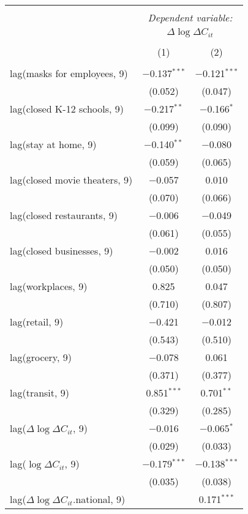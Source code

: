 \begin{tabular}{@{\extracolsep{1pt}}lcc} 
\\[-1.8ex]\hline 
\hline \\[-1.8ex] 
 & \multicolumn{2}{c}{\textit{Dependent variable:}} \\ 
\cline{2-3} 
 & \multicolumn{2}{c}{$\Delta \log \Delta C_{it}$} \\ 
\\[-1.8ex] & (1) & (2)\\ 
\hline \\[-1.8ex] 
 lag(masks for employees, 9) & $-$0.137$^{***}$ & $-$0.121$^{***}$ \\ 
  & (0.052) & (0.047) \\ 
  lag(closed K-12 schools, 9) & $-$0.217$^{**}$ & $-$0.166$^{*}$ \\ 
  & (0.099) & (0.090) \\ 
  lag(stay at home, 9) & $-$0.140$^{**}$ & $-$0.080 \\ 
  & (0.059) & (0.065) \\ 
  lag(closed movie theaters, 9) & $-$0.057 & 0.010 \\ 
  & (0.070) & (0.066) \\ 
  lag(closed restaurants, 9) & $-$0.006 & $-$0.049 \\ 
  & (0.061) & (0.055) \\ 
  lag(closed businesses, 9) & $-$0.002 & 0.016 \\ 
  & (0.050) & (0.050) \\ 
  lag(workplaces, 9) & 0.825 & 0.047 \\ 
  & (0.710) & (0.807) \\ 
  lag(retail, 9) & $-$0.421 & $-$0.012 \\ 
  & (0.543) & (0.510) \\ 
  lag(grocery, 9) & $-$0.078 & 0.061 \\ 
  & (0.371) & (0.377) \\ 
  lag(transit, 9) & 0.851$^{***}$ & 0.701$^{**}$ \\ 
  & (0.329) & (0.285) \\ 
  lag($\Delta \log \Delta C_{it}$, 9) & $-$0.016 & $-$0.065$^{*}$ \\ 
  & (0.029) & (0.033) \\ 
  lag($\log \Delta C_{it}$, 9) & $-$0.179$^{***}$ & $-$0.138$^{***}$ \\ 
  & (0.035) & (0.038) \\ 
  lag($\Delta \log \Delta C_{it}$.national, 9) &  & 0.171$^{***}$ \\ 

\end{tabular}
